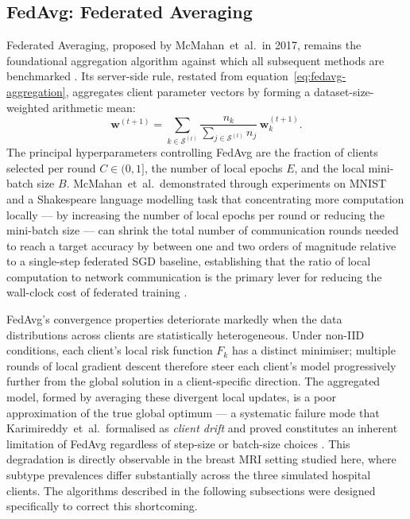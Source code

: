 \subsection{FedAvg: Federated Averaging}
\label{sec:fedavg}

Federated Averaging, proposed by McMahan~et~al.\ in 2017, remains the
foundational aggregation algorithm against which all subsequent methods
are benchmarked \cite{mcmahan2017communication}.
Its server-side rule, restated from equation~\eqref{eq:fedavg-aggregation},
aggregates client parameter vectors by forming a dataset-size-weighted
arithmetic mean:
\begin{equation}
  \mathbf{w}^{(t+1)}
  = \sum_{k \in \mathcal{S}^{(t)}}
    \frac{n_k}{\sum_{j \in \mathcal{S}^{(t)}} n_j}\,
    \mathbf{w}_k^{(t+1)}.
  \label{eq:fedavg-2}
\end{equation}
The principal hyperparameters controlling FedAvg are the fraction of
clients selected per round $C \in (0, 1]$, the number of local epochs
$E$, and the local mini-batch size $B$.
McMahan~et~al.\ demonstrated through experiments on MNIST and a
Shakespeare language modelling task that concentrating more computation
locally — by increasing the number of local epochs per round or reducing
the mini-batch size — can shrink the total number of communication rounds
needed to reach a target accuracy by between one and two orders of
magnitude relative to a single-step federated SGD baseline,
establishing that the ratio of local computation to network communication
is the primary lever for reducing the wall-clock cost of federated
training \cite{mcmahan2017communication}.

FedAvg's convergence properties deteriorate markedly when the data
distributions across clients are statistically heterogeneous.
Under non-IID conditions, each client's local risk function $F_k$ has a
distinct minimiser; multiple rounds of local gradient descent therefore
steer each client's model progressively further from the global solution
in a client-specific direction.
The aggregated model, formed by averaging these divergent local updates,
is a poor approximation of the true global optimum — a systematic failure
mode that Karimireddy~et~al.\ formalised as \emph{client drift} and
proved constitutes an inherent limitation of FedAvg regardless of
step-size or batch-size choices
\cite{karimireddy2020scaffold,kairouz2021advances,arbaoui2025survey}.
This degradation is directly observable in the breast MRI setting studied
here, where subtype prevalences differ substantially across the three
simulated hospital clients.
The algorithms described in the following subsections were designed
specifically to correct this shortcoming.

